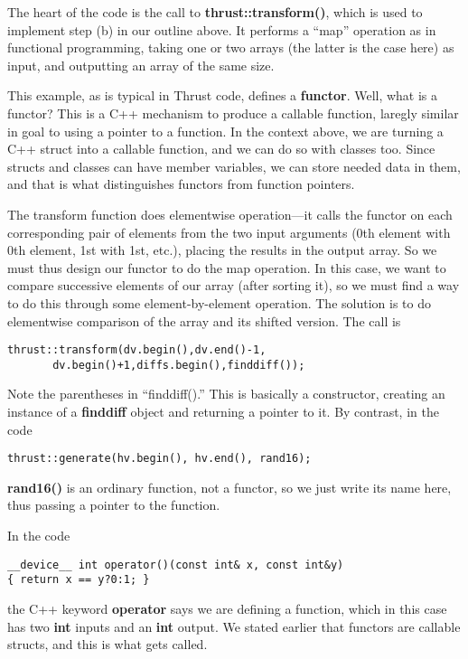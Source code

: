The heart of the code is the call to {\bf thrust::transform()}, which is
used to implement step (b) in our outline above.  It performs a ``map''
operation as in functional programming, taking one or two arrays (the
latter is the case here) as input, and outputting an array of the same
size.    

This example, as is typical in Thrust code, defines a {\bf functor}.
Well, what is a functor?  This is a C++ mechanism to produce a callable
function, laregly similar in goal to using a pointer to a function.  In
the context above, we are turning a C++ struct into a callable function,
and we can do so with classes too.  Since structs and classes can have
member variables, we can store needed data in them, and that is what
distinguishes functors from function pointers.  

The transform function does elementwise operation---it calls the functor
on each corresponding pair of elements from the two input arguments (0th
element with 0th element, 1st with 1st, etc.), placing the results in
the output array.  So we must thus design our functor to do the map
operation.  In this case, we want to compare successive elements of our
array (after sorting it), so we must find a way to do this through some
element-by-element operation.  The solution is to do elementwise
comparison of the array and its shifted version.  The call is

\begin{lstlisting}
thrust::transform(dv.begin(),dv.end()-1,
       dv.begin()+1,diffs.begin(),finddiff());
\end{lstlisting}

Note the parentheses in ``finddiff().''  This is basically a
constructor, creating an instance of a {\bf finddiff} object and
returning a pointer to it.  By contrast, in the code

\begin{lstlisting}
thrust::generate(hv.begin(), hv.end(), rand16);
\end{lstlisting}

{\bf rand16()} is an ordinary function, not a functor, so we just write
its name here, thus passing a pointer to the function.

In the code

\begin{lstlisting}
__device__ int operator()(const int& x, const int&y)
{ return x == y?0:1; }
\end{lstlisting}

the C++ keyword {\bf operator} says we are defining a function, which in
this case has two {\bf int} inputs and an {\bf int} output.  We stated
earlier that functors are callable structs, and this is what gets
called.

